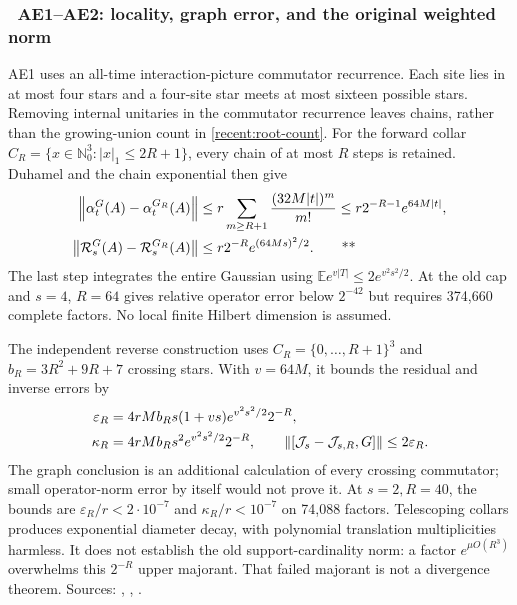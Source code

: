 \subsubsection{\workstar\ AE1--AE2: locality, graph error, and the original weighted norm}

AE1 uses an all-time interaction-picture commutator recurrence.  Each site lies
in at most four stars and a four-site star meets at most sixteen possible stars.
Removing internal unitaries in the commutator recurrence leaves chains, rather
than the growing-union count in \eqref{recent:root-count}.  For the forward
collar $C_R=\{x\in\mathbb N_0^3:|x|_1\le2R+1\}$, every chain of at most $R$
steps is retained.  Duhamel and the chain exponential then give
\begin{align}
 \left\lVert \alpha_t^G(A)-\alpha_t^{G_R}(A)\right\rVert
 &\le r\sum_{m\ge R+1}\frac{(32M|t|)^m}{m!}
 \le r2^{-R-1}e^{64M|t|},\notag\\
 \left\lVert \mathcal R_s^G(A)-\mathcal R_s^{G_R}(A)\right\rVert
 &\le r2^{-R}e^{(64Ms)^2/2}. \qquad\text{**}
 \label{recent:gaussian-locality}
\end{align}
The last step integrates the entire Gaussian using
$\mathbb E e^{v|T|}\le2e^{v^2s^2/2}$.  At the old cap and $s=4$, $R=64$ gives
relative operator error below $2^{-42}$ but requires 374,660 complete factors.
No local finite Hilbert dimension is assumed.

The independent reverse construction uses $C_R=\{0,\ldots,R+1\}^3$ and
$b_R=3R^2+9R+7$ crossing stars.  With $v=64M$, it bounds the residual and inverse
errors by
\begin{align}
 \varepsilon_R&=4rMb_Rs(1+vs)e^{v^2s^2/2}2^{-R},\notag\\
 \kappa_R&=4rMb_Rs^2e^{v^2s^2/2}2^{-R},\qquad
 \left\lVert [\mathcal J_s-\mathcal J_{s,R},G]\right\rVert\le2\varepsilon_R.
 \label{recent:gaussian-graph}
\end{align}
The graph conclusion is an additional calculation of every crossing commutator;
small operator-norm error by itself would not prove it.  At $s=2,R=40$, the
bounds are $\varepsilon_R/r<2\cdot10^{-7}$ and $\kappa_R/r<10^{-7}$ on
74,088 factors.  Telescoping collars produces exponential diameter decay, with
polynomial translation multiplicities harmless.  It does not establish the
old support-cardinality norm: a factor $e^{\mu O(R^3)}$ overwhelms this
$2^{-R}$ upper majorant.  That failed majorant is not a divergence theorem.
Sources: ,
,
.

